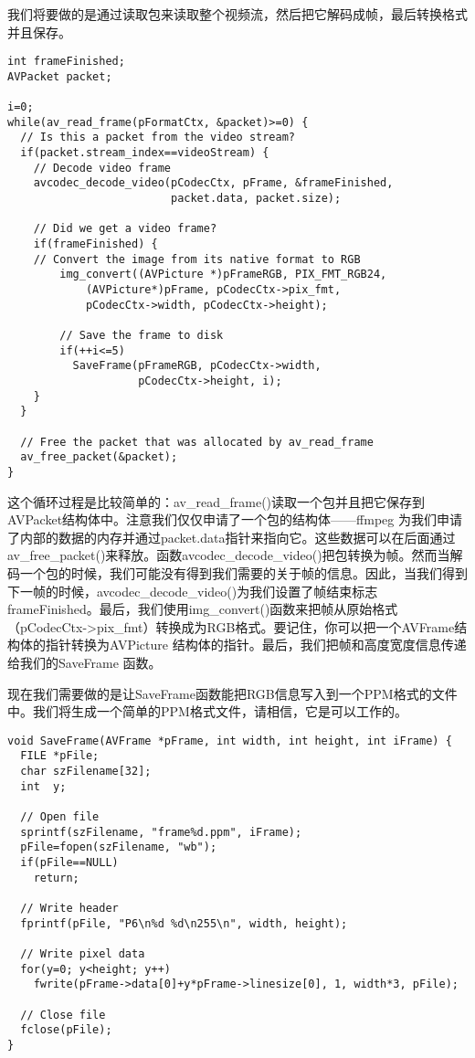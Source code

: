 我们将要做的是通过读取包来读取整个视频流，然后把它解码成帧，最后转换格式并且保存。
\begin{lstlisting}
int frameFinished;
AVPacket packet;

i=0;
while(av_read_frame(pFormatCtx, &packet)>=0) {
  // Is this a packet from the video stream?
  if(packet.stream_index==videoStream) {
    // Decode video frame
    avcodec_decode_video(pCodecCtx, pFrame, &frameFinished,
                         packet.data, packet.size);

    // Did we get a video frame?
    if(frameFinished) {
    // Convert the image from its native format to RGB
        img_convert((AVPicture *)pFrameRGB, PIX_FMT_RGB24,
            (AVPicture*)pFrame, pCodecCtx->pix_fmt,
            pCodecCtx->width, pCodecCtx->height);

        // Save the frame to disk
        if(++i<=5)
          SaveFrame(pFrameRGB, pCodecCtx->width,
                    pCodecCtx->height, i);
    }
  }

  // Free the packet that was allocated by av_read_frame
  av_free_packet(&packet);
}
\end{lstlisting}



这个循环过程是比较简单的：av_read_frame()读取一个包并且把它保存到AVPacket结构体中。注意我们仅仅申请了一个包的结构体——ffmpeg 为我们申请了内部的数据的内存并通过packet.data指针来指向它。这些数据可以在后面通过av_free_packet()来释放。函数avcodec_decode_video()把包转换为帧。然而当解码一个包的时候，我们可能没有得到我们需要的关于帧的信息。因此，当我们得到下一帧的时候，avcodec_decode_video()为我们设置了帧结束标志frameFinished。最后，我们使用img_convert()函数来把帧从原始格式（pCodecCtx->pix_fmt）转换成为RGB格式。要记住，你可以把一个AVFrame结构体的指针转换为AVPicture 结构体的指针。最后，我们把帧和高度宽度信息传递给我们的SaveFrame 函数。

现在我们需要做的是让SaveFrame函数能把RGB信息写入到一个PPM格式的文件中。我们将生成一个简单的PPM格式文件，请相信，它是可以工作的。

\begin{lstlisting}
void SaveFrame(AVFrame *pFrame, int width, int height, int iFrame) {
  FILE *pFile;
  char szFilename[32];
  int  y;

  // Open file
  sprintf(szFilename, "frame%d.ppm", iFrame);
  pFile=fopen(szFilename, "wb");
  if(pFile==NULL)
    return;

  // Write header
  fprintf(pFile, "P6\n%d %d\n255\n", width, height);

  // Write pixel data
  for(y=0; y<height; y++)
    fwrite(pFrame->data[0]+y*pFrame->linesize[0], 1, width*3, pFile);

  // Close file
  fclose(pFile);
}
\end{lstlisting}

